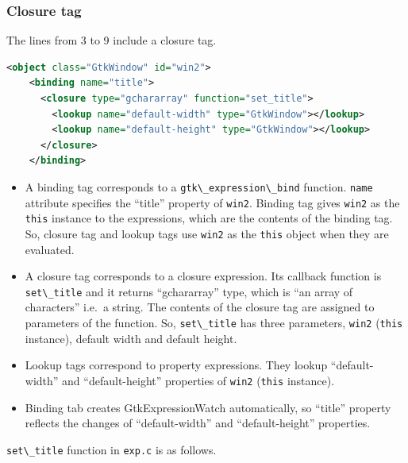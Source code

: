 \hypertarget{closure-tag}{%
\subsubsection{Closure tag}\label{closure-tag}}

The lines from 3 to 9 include a closure tag.

\begin{lstlisting}[language=XML]
  <object class="GtkWindow" id="win2">
    <binding name="title">
      <closure type="gchararray" function="set_title">
        <lookup name="default-width" type="GtkWindow"></lookup>
        <lookup name="default-height" type="GtkWindow"></lookup>
      </closure>
    </binding>
\end{lstlisting}

\begin{itemize}
\tightlist
\item
  A binding tag corresponds to a
  \passthrough{\lstinline!gtk\_expression\_bind!} function.
  \passthrough{\lstinline!name!} attribute specifies the ``title''
  property of \passthrough{\lstinline!win2!}. Binding tag gives
  \passthrough{\lstinline!win2!} as the \passthrough{\lstinline!this!}
  instance to the expressions, which are the contents of the binding
  tag. So, closure tag and lookup tags use
  \passthrough{\lstinline!win2!} as the \passthrough{\lstinline!this!}
  object when they are evaluated.
\item
  A closure tag corresponds to a closure expression. Its callback
  function is \passthrough{\lstinline!set\_title!} and it returns
  ``gchararray'' type, which is ``an array of characters'' i.e.~a
  string. The contents of the closure tag are assigned to parameters of
  the function. So, \passthrough{\lstinline!set\_title!} has three
  parameters, \passthrough{\lstinline!win2!}
  (\passthrough{\lstinline!this!} instance), default width and default
  height.
\item
  Lookup tags correspond to property expressions. They lookup
  ``default-width'' and ``default-height'' properties of
  \passthrough{\lstinline!win2!} (\passthrough{\lstinline!this!}
  instance).
\item
  Binding tab creates GtkExpressionWatch automatically, so ``title''
  property reflects the changes of ``default-width'' and
  ``default-height'' properties.
\end{itemize}

\passthrough{\lstinline!set\_title!} function in
\passthrough{\lstinline!exp.c!} is as follows.

